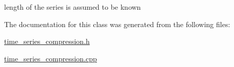 length of the series is assumed to be known 



The documentation for this class was generated from the following files\+:\begin{DoxyCompactItemize}
\item 
\hyperlink{time__series__compression_8h}{time\+\_\+series\+\_\+compression.\+h}\item 
\hyperlink{time__series__compression_8cpp}{time\+\_\+series\+\_\+compression.\+cpp}\end{DoxyCompactItemize}
